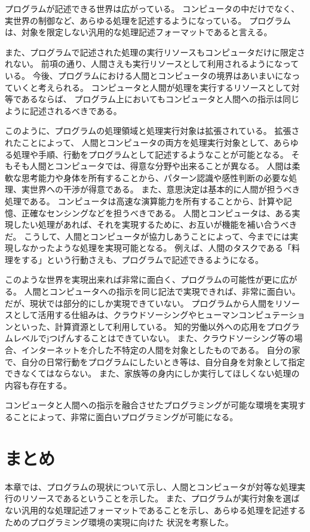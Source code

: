 プログラムが記述できる世界は広がっている。
コンピュータの中だけでなく、実世界の制御など、あらゆる処理を記述するようになっている。
プログラムは、対象を限定しない汎用的な処理記述フォーマットであると言える。

また、プログラムで記述された処理の実行リソースもコンピュータだけに限定されない。
前項の通り、人間さえも実行リソースとして利用されるようになっている。
今後、プログラムにおける人間とコンピュータの境界はあいまいになっていくと考えられる。
コンピュータと人間が処理を実行するリソースとして対等であるならば、
プログラム上においてもコンピュータと人間への指示は同じように記述されるべきである。

このように、プログラムの処理領域と処理実行対象は拡張されている。
拡張されたことによって、
人間とコンピュータの両方を処理実行対象として、あらゆる処理や手順、行動をプログラムとして記述するようなことが可能となる。
そもそも人間とコンピュータでは、得意な分野や出来ることが異なる。
人間は柔軟な思考能力や身体を所有することから、パターン認識や感性判断の必要な処理、実世界への干渉が得意である。
また、意思決定は基本的に人間が担うべき処理である。
コンピュータは高速な演算能力を所有することから、計算や記憶、正確なセンシングなどを担うべきである。
人間とコンピュータは、ある実現したい処理があれば、それを実現するために、お互いが機能を補い合うべきだ。
こうして、人間とコンピュータが協力しあうことによって、今までには実現しなかったような処理を実現可能となる。
例えば、人間のタスクである「料理をする」という行動さえも、プログラムで記述できるようになる。

このような世界を実現出来れば非常に面白く、プログラムの可能性が更に広がる。
人間とコンピュータへの指示を同じ記法で実現できれば、非常に面白い。
だが、現状では部分的にしか実現できていない。
プログラムから人間をリソースとして活用する仕組みは、クラウドソーシングやヒューマンコンピュテーションといった、計算資源として利用している。
知的労働以外への応用をプログラムレベルでjつげんすることはできていない。
また、クラウドソーシング等の場合、インターネットを介した不特定の人間を対象としたものである。
自分の家で、自分の日常行動をプログラムにしたいとき等は、自分自身を対象として指定できなくてはならない。
また、家族等の身内にしか実行してほしくない処理の内容も存在する。

コンピュータと人間への指示を融合させたプログラミングが可能な環境を実現することによって、非常に面白いプログラミングが可能になる。

\section{まとめ}\label{ux307eux3068ux3081}

本章では、プログラムの現状について示し、人間とコンピュータが対等な処理実行のリソースであるということを示した。
また、プログラムが実行対象を選ばない汎用的な処理記述フォーマットであることを示し、あらゆる処理を記述するためのプログラミング環境の実現に向けた
状況を考察した。
